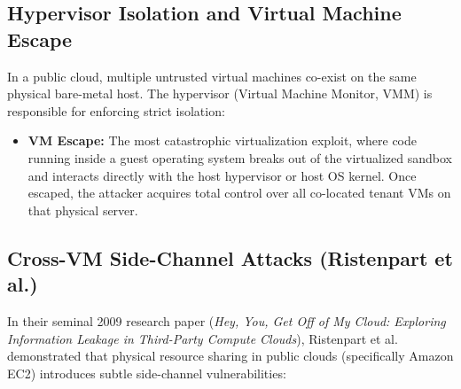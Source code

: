 \subsection{Hypervisor Isolation and Virtual Machine Escape}
In a public cloud, multiple untrusted virtual machines co-exist on the same physical bare-metal host. The hypervisor (Virtual Machine Monitor, VMM) is responsible for enforcing strict isolation:
\begin{itemize}[leftmargin=*]
  \item \textbf{VM Escape:} The most catastrophic virtualization exploit, where code running inside a guest operating system breaks out of the virtualized sandbox and interacts directly with the host hypervisor or host OS kernel. Once escaped, the attacker acquires total control over all co-located tenant VMs on that physical server.
\end{itemize}

\subsection{Cross-VM Side-Channel Attacks (Ristenpart et al.)}
In their seminal 2009 research paper (\emph{Hey, You, Get Off of My Cloud: Exploring Information Leakage in Third-Party Compute Clouds}), Ristenpart et al. demonstrated that physical resource sharing in public clouds (specifically Amazon EC2) introduces subtle side-channel vulnerabilities:

